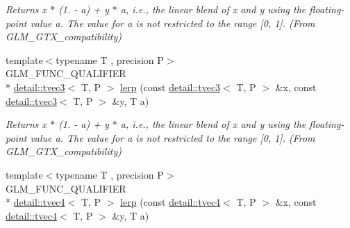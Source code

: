 \begin{DoxyCompactItemize}
\begin{DoxyCompactList}\small\item\em Returns x $\ast$ (1. -\/ a) + y $\ast$ a, i.\-e., the linear blend of x and y using the floating-\/point value a. The value for a is not restricted to the range \mbox{[}0, 1\mbox{]}. (From G\-L\-M\-\_\-\-G\-T\-X\-\_\-compatibility) \end{DoxyCompactList}\item 
\hypertarget{group__gtx__compatibility_ga5680b8166d1d6a5fa70cbfb56345a5e6}{{\footnotesize template$<$typename T , precision P$>$ }\\G\-L\-M\-\_\-\-F\-U\-N\-C\-\_\-\-Q\-U\-A\-L\-I\-F\-I\-E\-R \\*
\hyperlink{structglm_1_1detail_1_1tvec3}{detail\-::tvec3}$<$ T, P $>$ \hyperlink{group__gtx__compatibility_ga5680b8166d1d6a5fa70cbfb56345a5e6}{lerp} (const \hyperlink{structglm_1_1detail_1_1tvec3}{detail\-::tvec3}$<$ T, P $>$ \&x, const \hyperlink{structglm_1_1detail_1_1tvec3}{detail\-::tvec3}$<$ T, P $>$ \&y, T a)}\label{group__gtx__compatibility_ga5680b8166d1d6a5fa70cbfb56345a5e6}

\begin{DoxyCompactList}\small\item\em Returns x $\ast$ (1. -\/ a) + y $\ast$ a, i.\-e., the linear blend of x and y using the floating-\/point value a. The value for a is not restricted to the range \mbox{[}0, 1\mbox{]}. (From G\-L\-M\-\_\-\-G\-T\-X\-\_\-compatibility) \end{DoxyCompactList}\item 
\hypertarget{group__gtx__compatibility_ga063de7edddb13ecc44fcfddd9bf38111}{{\footnotesize template$<$typename T , precision P$>$ }\\G\-L\-M\-\_\-\-F\-U\-N\-C\-\_\-\-Q\-U\-A\-L\-I\-F\-I\-E\-R \\*
\hyperlink{structglm_1_1detail_1_1tvec4}{detail\-::tvec4}$<$ T, P $>$ \hyperlink{group__gtx__compatibility_ga063de7edddb13ecc44fcfddd9bf38111}{lerp} (const \hyperlink{structglm_1_1detail_1_1tvec4}{detail\-::tvec4}$<$ T, P $>$ \&x, const \hyperlink{structglm_1_1detail_1_1tvec4}{detail\-::tvec4}$<$ T, P $>$ \&y, T a)}\label{group__gtx__compatibility_ga063de7edddb13ecc44fcfddd9bf38111}


\end{DoxyCompactItemize}
